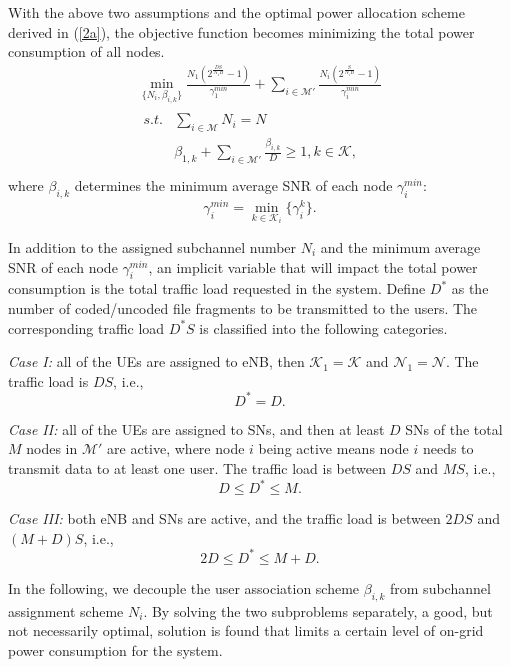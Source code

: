 \documentclass[journal,12pt,onecolumn]{IEEEtran}
\begin{document}
With the above two assumptions and the optimal power allocation scheme derived in (\ref{2a}), the objective function becomes minimizing the total power consumption of all nodes.
\begin{equation}\label{obj1_2}
\begin{array}{l}
\mathop {\min }\limits_{\{N_i,\beta_{i,k}\}}  \frac{N_1(2^\frac{DS}{N_1B}-1)}{\gamma_1^{min}}+\sum\limits_{i\in\mathcal{M}'}\frac{N_i(2^\frac{S}{N_iB}-1)}{\gamma_i^{min}} \\
\begin{array}{*{20}{l}}
{s.t.}& \sum\limits_{i\in\mathcal{M}}N_i=N\\
&\beta_{1,k}+\sum\limits_{i\in\mathcal{M'}}\frac{\beta_{i,k}}{D}\ge 1, k\in\mathcal{K},\\
\end{array}
\end{array}
\end{equation}
where $\beta_{i,k}$ determines the minimum average SNR of each node $\gamma_i^{min}$:
\begin{equation}
\gamma_i^{min}=\min\limits_{k\in\mathcal{K}_i}\{\gamma_{i}^k\}.
\end{equation}

In addition to the assigned subchannel number $N_i$ and the minimum average SNR of each node $\gamma_i^{min}$, an implicit variable that will impact the total power consumption is the total traffic load requested in the system. Define $D^*$ as the number of 
coded/uncoded file fragments to be transmitted to the users. The corresponding traffic load $D^*S$ is classified into the following categories.

\emph{Case I:} all of the UEs are assigned to eNB, then $\mathcal{K}_1=\mathcal{K}$ and $\mathcal{N}_1=\mathcal{N}$. The traffic load is $DS$, i.e.,
 \[D^*=D.\]

\emph{Case II:} all of the UEs are assigned to SNs, and then at least $D$ SNs of the total $M$ nodes in $\mathcal{M}'$ are active, where node $i$ being active means node $i$ needs to transmit data to at least one user. The traffic load is between $DS$ and $MS$, i.e.,
 \[D \le D^*\le M.\]

\emph{Case III:} both eNB and SNs are active, and the traffic load is between $2DS$ and $(M+D)S$, i.e.,
 \[2D \le D^*\le M+D.\]


In the following, we decouple the user association scheme $\beta_{i,k}$ from subchannel assignment scheme $N_i$. By solving the two subproblems separately, a good, but not necessarily optimal, solution is found that limits a certain level of on-grid power consumption for the system.
\end{document}
